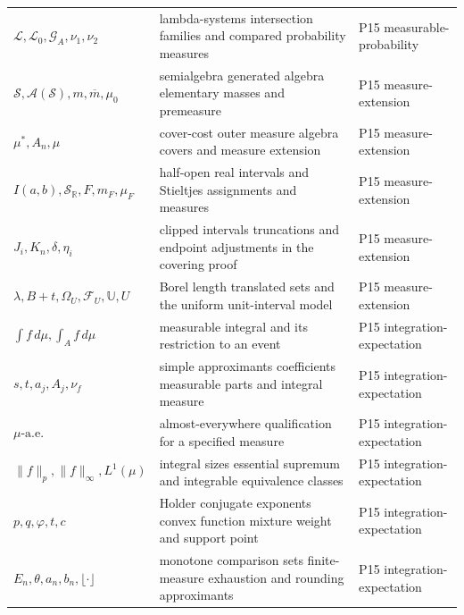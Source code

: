 \begin{longtable}{@{}p{}p{}p{}@{}}
\(\mathcal L,\allowbreak \mathcal L_0,\allowbreak \mathcal G_A,\allowbreak \nu_1,\allowbreak \nu_2\) & lambda-systems intersection families and compared probability measures & P15 measurable-\allowbreak{}probability \\
\(\mathcal S,\allowbreak \mathcal A(\mathcal S),\allowbreak m,\allowbreak \overline m,\allowbreak \mu_0\) & semialgebra generated algebra elementary masses and premeasure & P15 measure-\allowbreak{}extension \\
\(\mu^*,\allowbreak A_n,\allowbreak \mu\) & cover-cost outer measure algebra covers and measure extension & P15 measure-\allowbreak{}extension \\
\(I(a,\allowbreak b),\allowbreak \mathcal S_{\mathbb R},\allowbreak F,\allowbreak m_F,\allowbreak \mu_F\) & half-open real intervals and Stieltjes assignments and measures & P15 measure-\allowbreak{}extension \\
\(J_i,\allowbreak K_n,\allowbreak \delta,\allowbreak \eta_i\) & clipped intervals truncations and endpoint adjustments in the covering proof & P15 measure-\allowbreak{}extension \\
\(\lambda,\allowbreak B+t,\allowbreak \Omega_U,\allowbreak \mathcal F_U,\allowbreak \mathbb U,\allowbreak U\) & Borel length translated sets and the uniform unit-interval model & P15 measure-\allowbreak{}extension \\
\(\int f\,d\mu,\allowbreak \int_A f\,d\mu\) & measurable integral and its restriction to an event & P15 integration-\allowbreak{}expectation \\
\(s,\allowbreak t,\allowbreak a_j,\allowbreak A_j,\allowbreak \nu_f\) & simple approximants coefficients measurable parts and integral measure & P15 integration-\allowbreak{}expectation \\
\(\mu\text{-a.e.}\) & almost-everywhere qualification for a specified measure & P15 integration-\allowbreak{}expectation \\
\(\|f\|_p,\allowbreak \|f\|_\infty,\allowbreak L^1(\mu)\) & integral sizes essential supremum and integrable equivalence classes & P15 integration-\allowbreak{}expectation \\
\(p,\allowbreak q,\allowbreak \varphi,\allowbreak t,\allowbreak c\) & Holder conjugate exponents convex function mixture weight and support point & P15 integration-\allowbreak{}expectation \\
\(E_n,\allowbreak \theta,\allowbreak a_n,\allowbreak b_n,\allowbreak \lfloor\cdot\rfloor\) & monotone comparison sets finite-measure exhaustion and rounding approximants & P15 integration-\allowbreak{}expectation \\

\end{longtable}
